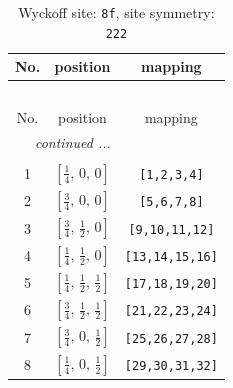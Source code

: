\documentclass[fleqn,8pt]{jsarticle}
\begin{document}
\begin{longtable}{ccc}
\caption{Wyckoff site: {\tt 8f}, site symmetry: {\tt 222}}
 \\
 \hline \hline
No. & position & mapping \\ \hline \endfirsthead

\multicolumn{2}{l}{\tablename\ \thetable{}} \\
 \hline \hline
No. & position & mapping \\ \hline \endhead

 \hline \hline
\multicolumn{2}{r}{\footnotesize\it continued ...} \\ \endfoot

 \hline \hline
\multicolumn{2}{r}{} \\ \endlastfoot

1 & $\left[ \frac{1}{4},\, 0,\, 0 \right]$ & {\tt [1,2,3,4]} \\ \hline
2 & $\left[ \frac{3}{4},\, 0,\, 0 \right]$ & {\tt [5,6,7,8]} \\ \hline
3 & $\left[ \frac{3}{4},\, \frac{1}{2},\, 0 \right]$ & {\tt [9,10,11,12]} \\ \hline
4 & $\left[ \frac{1}{4},\, \frac{1}{2},\, 0 \right]$ & {\tt [13,14,15,16]} \\ \hline
5 & $\left[ \frac{1}{4},\, \frac{1}{2},\, \frac{1}{2} \right]$ & {\tt [17,18,19,20]} \\ \hline
6 & $\left[ \frac{3}{4},\, \frac{1}{2},\, \frac{1}{2} \right]$ & {\tt [21,22,23,24]} \\ \hline
7 & $\left[ \frac{3}{4},\, 0,\, \frac{1}{2} \right]$ & {\tt [25,26,27,28]} \\ \hline
8 & $\left[ \frac{1}{4},\, 0,\, \frac{1}{2} \right]$ & {\tt [29,30,31,32]} \\
\end{longtable}
\renewcommand{\arraystretch}{1.2}
\end{document}
